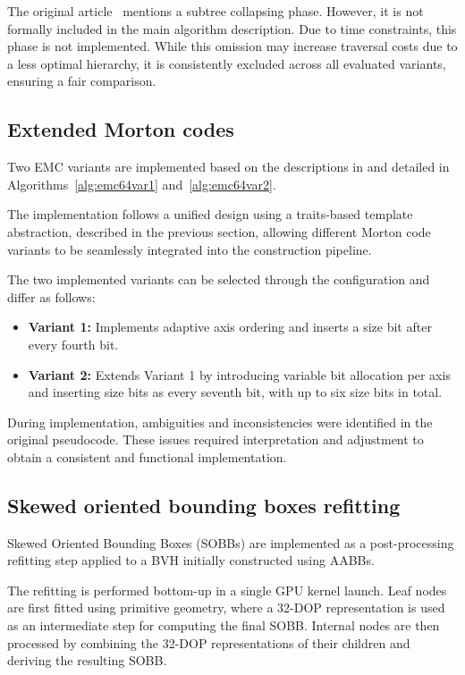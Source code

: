 The original article~\cite{MB17} mentions a subtree collapsing phase. However, it is not formally included in the main algorithm description. Due to time constraints, this phase is not implemented. While this omission may increase traversal costs due to a less optimal hierarchy, it is consistently excluded across all evaluated variants, ensuring a fair comparison.

\subsection{Extended Morton codes}

Two EMC variants are implemented based on the descriptions in \cite{Vinkler2017} and detailed in Algorithms~\ref{alg:emc64var1} and~\ref{alg:emc64var2}.

The implementation follows a unified design using a traits-based template abstraction, described in the previous section, allowing different Morton code variants to be seamlessly integrated into the construction pipeline.

The two implemented variants can be selected through the configuration and differ as follows:

\begin{itemize}
    \item \textbf{Variant 1:} Implements adaptive axis ordering and inserts a size bit after every fourth bit.
    
    \item \textbf{Variant 2:} Extends Variant 1 by introducing variable bit allocation per axis and inserting size bits as every seventh bit, with up to six size bits in total.
\end{itemize}

During implementation, ambiguities and inconsistencies were identified in the original pseudocode. These issues required interpretation and adjustment to obtain a consistent and functional implementation.

\subsection{Skewed oriented bounding boxes refitting}

Skewed Oriented Bounding Boxes (SOBBs) are implemented as a post-processing refitting step applied to a BVH initially constructed using AABBs.

The refitting is performed bottom-up in a single GPU kernel launch. Leaf nodes are first fitted using primitive geometry, where a 32-DOP representation is used as an intermediate step for computing the final SOBB. Internal nodes are then processed by combining the 32-DOP representations of their children and deriving the resulting SOBB.

